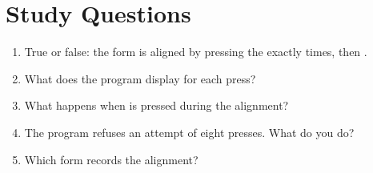 \section{Study Questions}
\begin{enumerate}
\item True or false: the form is aligned by pressing the 
  exactly  times, then .
\item What does the program display for each press?
\item What happens when  is pressed during the alignment?
\item The program refuses an attempt of eight presses.  What do you do?
\item Which form records the alignment?
\end{enumerate}
